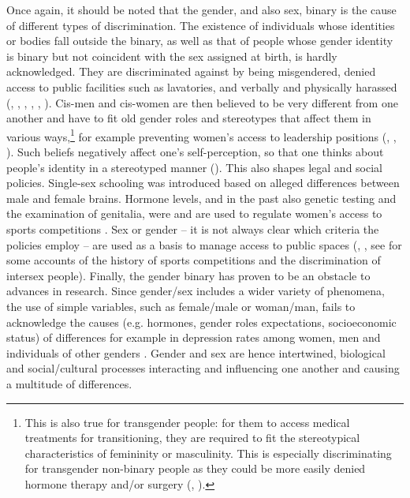 Once again, it should be noted that the gender, and also sex, binary is the cause of different types of discrimination. The existence of individuals whose identities or bodies fall outside the binary, as well as that of people whose gender identity is binary but not coincident with the sex assigned at birth, is hardly acknowledged. They are discriminated against by being misgendered, denied access to public facilities such as lavatories, and verbally and physically harassed (\cite{herman2013gendered}, \cite{mclemore2015experiences}, \cite*{mclemore2018minority}, \cite[118]{matsuno2017non}, \cite{lester2018trans}, \cite[184]{hyde2019future}). 
Cis-men and cis-women are then believed to be very different from one another and have to fit old gender roles and stereotypes that affect them in various ways,\footnote{This is also true for transgender people: for them to access medical treatments for transitioning, they are required to fit the stereotypical characteristics of femininity or masculinity. This is especially discriminating for transgender non-binary people as they could be more easily denied hormone therapy and/or surgery (\cite[28]{prona2016mein}, \cite{lester2018trans}).} for example preventing women's access to leadership positions (\cite{grover2015second}, \cite[132]{barker2018rewriting}, \cite[183--184]{hyde2019future}). Such beliefs negatively affect one's self-perception, so that one thinks about people's identity in a stereotyped manner (\cite[184]{hyde2019future}). This also shapes legal and social policies. Single-sex schooling was introduced based on alleged differences between male and female brains. Hormone levels, and in the past also genetic testing and the examination of genitalia, were and are used to regulate women's access to sports competitions \citep{sterling2020science}. Sex or gender -- it is not always clear which criteria the policies employ -- are used as a basis to manage access to public spaces (\cite{van2017biological}, \cite[184]{hyde2019future}, see \cite{sterling2020science} for some accounts of the history of sports competitions and the discrimination of intersex people). Finally, the gender binary has proven to be an obstacle to advances in research. Since gender/sex includes a wider variety of phenomena, the use of simple variables, such as female/male or woman/man, fails to acknowledge the causes (e.g. hormones, gender roles expectations, socioeconomic status) of differences for example in depression rates among women, men and individuals of other genders \citep[184]{hyde2019future}. Gender and sex are hence intertwined, biological and social/cultural processes interacting and influencing one another and causing a multitude of differences. 


